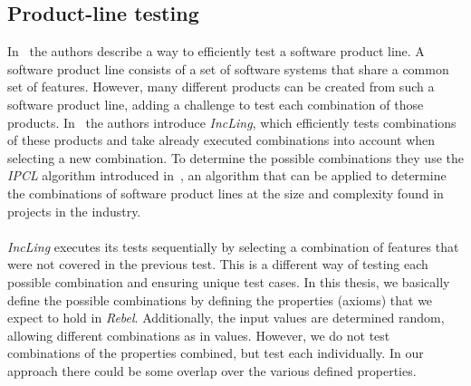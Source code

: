 \subsection{Product-line testing}
In~\cite{al2016incling} the authors describe a way to efficiently test a software product line. A software product line consists of a set of software systems that share a common set of features. However, many different products can be created from such a software product line, adding a challenge to test each combination of those products. In~\cite{al2016incling} the authors introduce \textit{IncLing}, which efficiently tests combinations of these products and take already executed combinations into account when selecting a new combination. To determine the possible combinations they use the \textit{IPCL} algorithm introduced in~\cite{johansen2012algorithm}, an algorithm that can be applied to determine the combinations of software product lines at the size and complexity found in projects in the industry.\\
\\
\textit{IncLing} executes its tests sequentially by selecting a combination of features that were not covered in the previous test. This is a different way of testing each possible combination and ensuring unique test cases. In this thesis, we basically define the possible combinations by defining the properties (axioms) that we expect to hold in \textit{Rebel}. Additionally, the input values are determined random, allowing different combinations as in values. However, we do not test combinations of the properties combined, but test each individually. In our approach there could be some overlap over the various defined properties.
